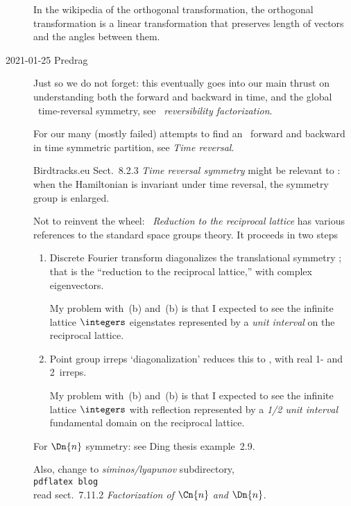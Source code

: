\begin{description}
In the
{wikipedia of the orthogonal transformation},
the orthogonal transformation is a linear transformation that preserves length of vectors and
the angles between them.

    \item[2021-01-25 Predrag]
Just so we do not forget: this eventually goes into
 our main thrust on understanding both the forward and backward in
time, and the global \templatt\ time-reversal symmetry, see
 {\em \tempLatt\ reversibility factorization}.

For our many (mostly failed) attempts to find an \AW\ forward and backward in
time symmetric partition, see  {\em Time reversal}.

{Birdtracks.eu Sect.~8.2.3}
{\em  Time reversal symmetry} might be relevant to \catlatt: when the
Hamiltonian is invariant under time reversal, the symmetry group is
enlarged.

Not to reinvent the wheel:
~{\em Reduction to the reciprocal lattice}
has various references to the standard space groups theory.
It proceeds in two steps
\begin{enumerate}
  \item
Discrete Fourier transform diagonalizes the translational symmetry
\Cn{\period{}}; that is the ``reduction to the reciprocal lattice,'' with
complex eigenvectors.

My problem with \,(b) and
\,(b) is that I expected to see the
infinite lattice $\integers$ eigenstates represented by a \emph{unit
interval} on the reciprocal lattice.
  \item
Point group  irreps `diagonalization' reduces this to
\Dn{\period{}}, with real 1- and 2\dmn\ irreps.

My problem with \,(b) and
\,(b) is that I expected to see the
infinite lattice $\integers$ with reflection represented by a \emph{1/2
unit interval} fundamental domain on the reciprocal lattice.
\end{enumerate}

For $\Dn{n}$ symmetry: see
{Ding thesis example~2.9.}

Also, change to  \emph{siminos/lyapunov} subdirectory,\\
\texttt{pdflatex blog }\\
read sect.~7.11.2
\emph{Factorization of $\Cn{n}$ and $\Dn{n}$}.


\end{description}
